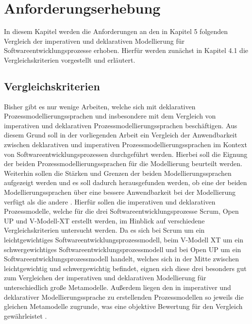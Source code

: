 
\chapter{Anforderungserhebung}\label{sec:chapter5}
In diesem Kapitel werden die Anforderungen an den in Kapitel 5 folgenden Vergleich der imperativen und deklarativen Modellierung für Softwareentwicklungsprozesse erhoben. Hierfür werden zunächst in Kapitel 4.1 die Vergleichskriterien vorgestellt und erläutert. 

\section{Vergleichskriterien}\label{sec:chapter5:Vergleichskriterien}

Bisher gibt es nur wenige Arbeiten, welche sich mit deklarativen Prozessmodellierungssprachen und insbesondere mit dem Vergleich von imperativen und deklarativen Prozessmodellierungssprachen beschäftigen. Aus diesem Grund soll in der vorliegenden Arbeit ein Vergleich der Anwendbarkeit zwischen deklarativen und imperativen Prozessmodellierungssprachen im Kontext von Softwareentwicklungsprozessen durchgeführt werden. Hierbei soll die Eignung der beiden Prozessmodellierungssprachen für die Modellierung beurteilt werden. Weiterhin sollen die Stärken und Grenzen der beiden Modellierungssprachen aufgezeigt werden und es soll dadurch herausgefunden werden, ob eine der beiden Modellierungssprachen über eine bessere Anwendbarkeit bei der Modellierung verfügt als die andere \cite{list2006evaluation}.\newline
Hierfür sollen die imperativen und deklarativen Prozessmodelle, welche für die drei Softwareentwicklungsprozesse Scrum, Open UP und V-Modell-XT erstellt werden, im Hinblick auf verschiedene Vergleichskriterien untersucht werden. Da es sich bei Scrum um ein leichtgewichtiges Softwareentwicklungsprozessmodell, beim V-Modell XT um ein schwergewichtiges Softwareentwicklungsprozessmodell und bei Open UP um ein Softwareentwicklungsprozessmodell handelt, welches sich in der Mitte zwischen leichtgewichtig und schwergewichtig befindet, eignen sich diese drei besonders gut zum Vergleichen der imperativen und deklarativen Modellierung für unterschiedlich große Metamodelle. Außerdem liegen den in imperativer und deklarativer Modellierungssprache zu erstellenden Prozessmodellen so jeweils die gleichen Metamodelle zugrunde, was eine objektive Bewertung für den Vergleich gewährleistet \cite{list2006evaluation}. \newline

